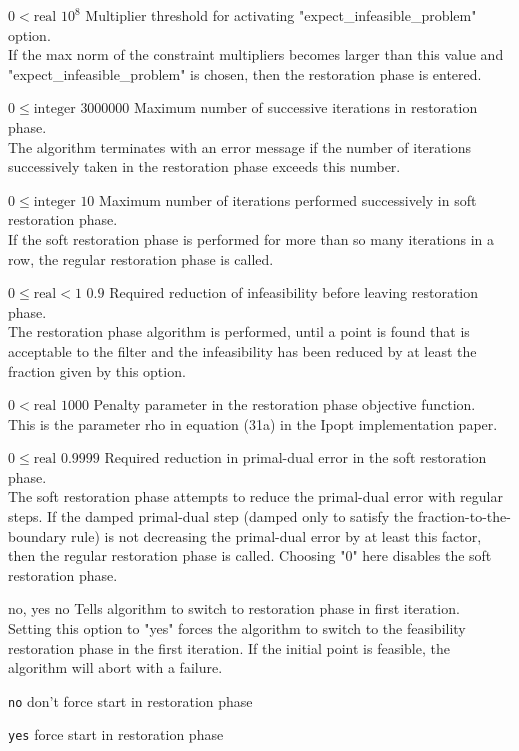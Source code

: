 %
{$0<\textrm{real}$}%
{$10^{  8}$}%
{Multiplier threshold for activating "expect\_infeasible\_problem" option.\\
If the max norm of the constraint multipliers becomes larger than this value and "expect\_infeasible\_problem" is chosen, then the restoration phase is entered.}%
{}

%
{$0\leq\textrm{integer}$}%
{$3000000$}%
{Maximum number of successive iterations in restoration phase.\\
The algorithm terminates with an error message if the number of iterations successively taken in the restoration phase exceeds this number.}%
{}

%
{$0\leq\textrm{integer}$}%
{$10$}%
{Maximum number of iterations performed successively in soft restoration phase.\\
If the soft restoration phase is performed for more than so many iterations in a row, the regular restoration phase is called.}%
{}

%
{$0\leq\textrm{real}<1$}%
{$0.9$}%
{Required reduction of infeasibility before leaving restoration phase.\\
The restoration phase algorithm is performed, until a point is found that is acceptable to the filter and the infeasibility has been reduced by at least the fraction given by this option.}%
{}

%
{$0<\textrm{real}$}%
{$1000$}%
{Penalty parameter in the restoration phase objective function.\\
This is the parameter rho in equation (31a) in the Ipopt implementation paper.}%
{}

%
{$0\leq\textrm{real}$}%
{$0.9999$}%
{Required reduction in primal-dual error in the soft restoration phase.\\
The soft restoration phase attempts to reduce the primal-dual error with regular steps. If the damped primal-dual step (damped only to satisfy the fraction-to-the-boundary rule) is not decreasing the primal-dual error by at least this factor, then the regular restoration phase is called. Choosing "0" here disables the soft restoration phase.}%
{}

%
{no, yes}%
{no}%
{Tells algorithm to switch to restoration phase in first iteration.\\
Setting this option to "yes" forces the algorithm to switch to the feasibility restoration phase in the first iteration. If the initial point is feasible, the algorithm will abort with a failure.}%
{\begin{list}{}{
\setlength{\parsep}{0em}
\setlength{\leftmargin}{5ex}
\setlength{\labelwidth}{2ex}
\setlength{\itemindent}{0ex}
\setlength{\topsep}{0pt}}
\item[\texttt{no}] don't force start in restoration phase
\item[\texttt{yes}] force start in restoration phase
\end{list}
}

